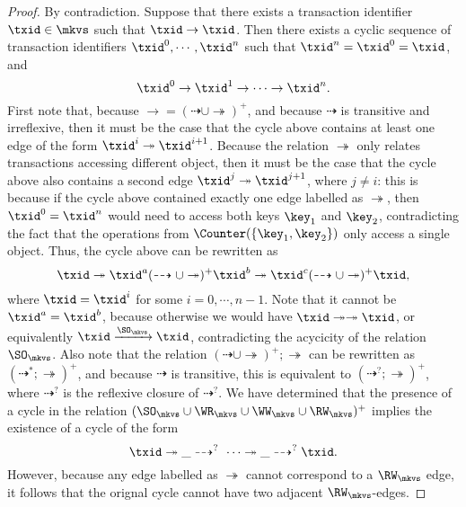 \begin{proof}
By contradiction. Suppose that there exists a transaction identifier $\txid \in \mkvs$ such that 
$\txid \rightarrow \txid$. Then there exists a cyclic sequence of transaction identifiers 
$\txid^{0}, \cdots, \txid^{n}$ such that $\txid^{n} =  \txid^{0} = \txid$, and
\[ 
\txid^{0} \rightarrow \txid^{1} \rightarrow \cdots \rightarrow \txid^{n}.
\]
First note that, because $\rightarrow = (\dashrightarrow \cup \twoheadrightarrow)^{+}$, 
and because $\dashrightarrow$ is transitive and irreflexive, then it must be the 
case that the cycle above contains at least one edge of the form $\txid^{i} \twoheadrightarrow \txid^{i+1}$. 
Because the relation $\twoheadrightarrow$ only relates transactions accessing different object, 
then it must be the case that the cycle above also contains a second edge $\txid^{j} \twoheadrightarrow \txid^{j+1}$, 
where $j \neq i$: this is because if the cycle above contained exactly one edge labelled as $\twoheadrightarrow$, 
then $\txid^{0} = \txid^{n}$ would need to access both keys $\key_1$ and $\key_2$, contradicting the 
fact that the operations from $\Counter(\{\key_1, \key_2\})$ only access a single object. 
Thus, the cycle above can be rewritten as 
\[ 
\txid \twoheadrightarrow \txid^{a} (\dashrightarrow \cup \twoheadrightarrow)^{+} \txid^{b} \twoheadrightarrow  \txid^{c} (\dashrightarrow \cup \twoheadrightarrow)^{+} \txid, 
\]
where $\txid = \txid^{i}$ for some $i=0,\cdots, n-1$. Note that it cannot be $\txid^{a} = \txid^{b}$, because 
otherwise we would have $\txid \twoheadrightarrow \twoheadrightarrow \txid$, or equivalently 
$\txid \xrightarrow{\SO_{\mkvs}} \txid$, contradicting the acycicity of the relation $\SO_{\mkvs}$. 
Also note that the relation $(\dashrightarrow \cup \twoheadrightarrow)^{+} ; \twoheadrightarrow$ can be rewritten as 
$(\dashrightarrow^{*} ; \twoheadrightarrow)^{+}$, and because $\dashrightarrow$ is transitive, 
this is equivalent to $(\dashrightarrow^{?} ; \twoheadrightarrow)^{+}$, where $\dashrightarrow^{?}$ is 
the reflexive closure of $\dashrightarrow^{?}$. 
We have determined that the presence of a cycle in the relation $(\SO_{\mkvs} \cup \WR_{\mkvs} \cup \WW_{\mkvs} \cup \RW_{\mkvs})^{+}$ 
implies the existence of a cycle of the form 
\[
\txid \twoheadrightarrow \_ \dashrightarrow^{?} \ \cdots \twoheadrightarrow \_ \dashrightarrow^{?} \txid.
\]
However, because any edge labelled as $\twoheadrightarrow$ cannot correspond to a $\RW_{\mkvs}$ edge, 
it follows that the orignal cycle cannot have two adjacent $\RW_{\mkvs}$-edges. 
%

\end{proof}
